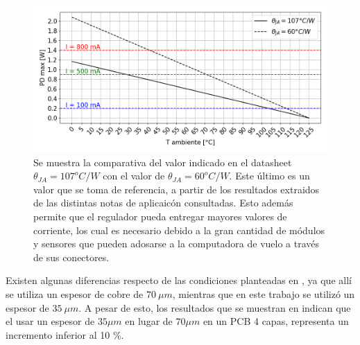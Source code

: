 \begin{figure}[htb]
    \centering
    \includegraphics[width=\textwidth]{img/ldo_potencia_disipable_2.png}
    \caption{Se muestra la comparativa del valor indicado en el datasheet $\theta_{JA} = 107^o C/W$ con el valor de $\theta_{JA} = 60^o C/W$. Este último es un valor que se toma de referencia, a partir de los resultados extraidos de las distintas notas de aplicaicón consultadas. Esto además permite que el regulador pueda entregar mayores valores de corriente, los cual es necesario debido a la gran cantidad de módulos y sensores que pueden adosarse a la computadora de vuelo a través de sus conectores.}
    \label{fig:ldo_potencia_disipable}
\end{figure}




Existen algunas diferencias respecto de las condiciones planteadas en \cite{AN1028_thermal}, ya que allí se utiliza un espesor de cobre de $70 \ \mu m$, mientras que en este trabajo se utilizó un espesor de $35 \ \mu m$. A pesar de esto, los resultados que se muestran en \cite{ROHM_thermal} indican que el usar un espesor de $35 \mu m$ en lugar de $70 \mu m$ en un PCB 4 capas, representa un incremento inferior al 10 \%.

